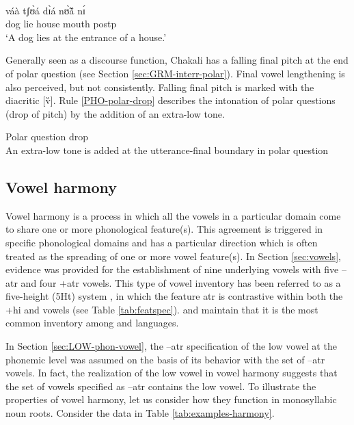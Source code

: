 \newpage 

 
\begin{exe}
\ex\label{ex:PHO-downdrift}

\glll {\Tten \Teight} {\Tseven \Tnine} {\Tfive \Tsix} {\Ttwo \Tfour} {\Tthree}\\
váà tʃʊ̀á dɪ̀á nʊ̃̀ã́ nɪ́ \\
dog lie house mouth {\sc postp} \\
\glt  `A dog lies at the entrance of a house.'
\end{exe}




Generally seen as a discourse function, Chakali has a falling final pitch at the end of polar question (see Section \ref{sec:GRM-interr-polar}). Final vowel lengthening is also perceived, but not consistently.  Falling final pitch is marked with the diacritic [v̏]. Rule \ref{PHO-polar-drop} describes the intonation  of  polar questions (drop of pitch) by the addition of an extra-low tone.

\begin{Rule}\label{PHO-polar-drop}{Polar question drop}\\
An extra-low tone is added at the utterance-final boundary in polar question\\

\end{Rule}


\subsection{Vowel harmony}
\label{sec:vowel-harmony}

Vowel harmony is a process in  which all the vowels in a particular domain come to share one or more phonological feature(s).   This agreement  is triggered in specific phonological domains and  has a particular direction which is often treated as the spreading of one or more vowel feature(s).  In Section \ref{sec:vowels},  evidence was provided for the establishment of nine underlying vowels with five {\sc --atr} and four  {\sc +atr} vowels. This type of  vowel inventory has been referred to as  a five-height (5Ht) system \citep[308]{Casa03},  in which the feature {\sc atr} is contrastive within both the {\sc +hi} and {\sc [--hi, --lo]} vowels (see Table \ref{tab:featspec}).  \citet[81--82]{Daku97} and \citet[312]{Casa03} maintain that it is the most common inventory among  and  languages. 

In Section \ref{sec:LOW-phon-vowel},  the
{\sc --atr} specification of the low vowel at the phonemic level was assumed
  on the basis of its behavior with the set of {\sc --atr} vowels. In
fact, the  realization of the low vowel in vowel harmony suggests that the set
of vowels specified as {\sc --atr}  contains the low vowel. To illustrate
the properties of vowel harmony, let us consider
how they function in  monosyllabic noun roots. Consider the data in
Table
\ref{tab:examples-harmony}.



